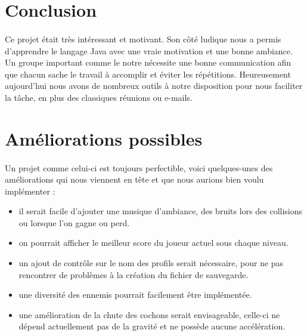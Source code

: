 \documentclass[a4paper,12pt]{report}
\begin{document}
\section{Conclusion}
\paragraph{}Ce projet était très intéressant et motivant. Son côté ludique nous a permis d'apprendre le langage Java avec une vraie motivation et une bonne ambiance. Un groupe important comme le notre nécessite une bonne communication afin que chacun sache le travail à accomplir et éviter les répétitions. Heureusement aujourd'hui nous avons de nombreux outils à notre disposition pour nous faciliter la tâche, en plus des classiques réunions ou e-mails.

\section{Améliorations possibles}
\paragraph{}Un projet comme celui-ci est toujours perfectible, voici quelques-unes des améliorations qui nous viennent en tête et que nous aurions bien voulu implémenter :
\begin{itemize}
\item il serait facile d'ajouter une musique d'ambiance, des bruits lors des collisions ou lorsque l'on gagne ou perd.
\item on pourrait afficher le meilleur score du joueur actuel sous chaque niveau.
\item un ajout de contrôle sur le nom des profils serait nécessaire, pour ne pas rencontrer de problèmes à la création du fichier de sauvegarde.
\item une diversité des ennemis pourrait facilement être implémentée.
\item une amélioration de la chute des cochons serait envisageable, celle-ci ne dépend actuellement pas de la gravité et ne possède aucune accélération.
\end{itemize}
\end{document}
